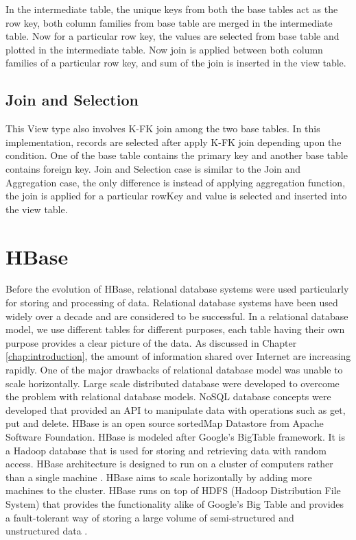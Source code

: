 \documentclass[11pt,a4paper,bibtotoc,idxtotoc,headsepline,footsepline,footexclude,BCOR12mm,DIV13]{scrbook}
\begin{document}
In the intermediate table, the unique keys from both the base tables act as the row key, both column families from base table are merged in the intermediate table. Now for a particular row key, the values are selected from base table and plotted in the intermediate table. Now join is applied between both column families of a particular row key, and sum of the join is inserted in the view table.  


\subsection{Join and Selection}
This View type also involves K-FK join among the two base tables. In this implementation, records are selected after apply K-FK join depending upon the condition. One of the base table contains the primary key and another base table contains foreign key. Join and Selection case is similar to the Join and Aggregation case, the only difference is instead of applying aggregation function, the join is applied for a particular rowKey and value is selected and inserted into the view table. 

\newpage
\section{HBase}
\label{sec:hbase}

Before the evolution of HBase, relational database systems were used particularly for storing and processing of data. Relational database systems have been used widely over a decade and are considered to be successful. In a relational database model, we use different tables for different purposes, each table having their own purpose provides  
a clear picture of the data. As discussed in Chapter \ref{chap:introduction}, the amount of information shared over Internet are increasing rapidly. One of the major drawbacks of relational database model was unable to scale horizontally. Large scale distributed database were developed to overcome the problem with relational database models. NoSQL database concepts were developed that provided an API to manipulate data with operations such as get, put and delete. HBase is an open source sortedMap Datastore from Apache Software Foundation. HBase is modeled after Google's BigTable framework. It is a Hadoop database that is used for storing and retrieving data with random access. HBase architecture is designed to run on a cluster of computers rather than a single machine \cite{coprocessor:detail}. HBase aims to scale horizontally by adding more machines to the cluster. HBase runs on top of HDFS (Hadoop Distribution File System) that provides the functionality alike of Google's Big Table and provides a fault-tolerant way of storing a large volume of semi-structured and unstructured data \cite{bigdata:analysis}.
\end{document}
